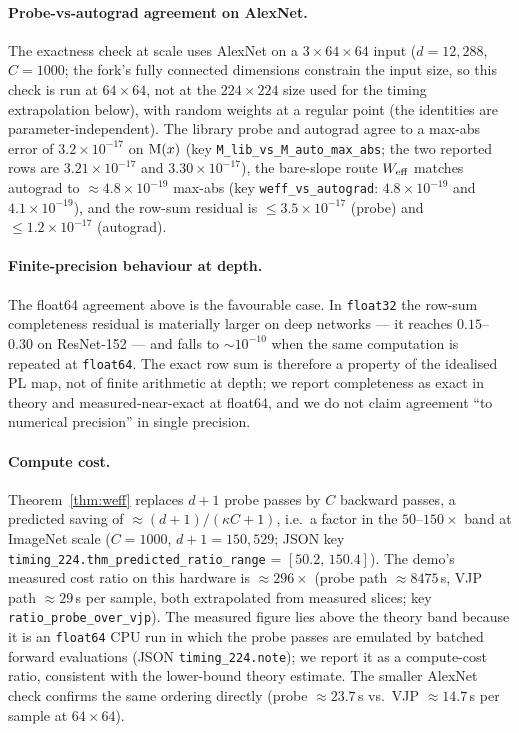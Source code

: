 \paragraph{Probe-vs-autograd agreement on AlexNet.}
The exactness check at scale uses AlexNet on a $3\times64\times64$ input
($d=12{,}288$, $C=1000$; the fork's fully connected dimensions constrain the
input size, so this check is run at $64\times64$, not at the $224\times224$
size used for the timing extrapolation below), with random weights at a
regular point (the identities are parameter-independent). The library probe
and autograd agree to a max-abs error of $3.2\times10^{-17}$ on $\mathrm{M}(x)$ (key
\texttt{M\_lib\_vs\_M\_auto\_max\_abs}; the two reported rows are
$3.21\times10^{-17}$ and $3.30\times10^{-17}$), the bare-slope route
$W_{\text{eff}}$ matches autograd to $\approx 4.8\times10^{-19}$ max-abs (key
\texttt{weff\_vs\_autograd}: $4.8\times10^{-19}$ and $4.1\times10^{-19}$),
and the row-sum residual is $\le 3.5\times10^{-17}$ (probe) and
$\le 1.2\times10^{-17}$ (autograd).

\paragraph{Finite-precision behaviour at depth.}
The float64 agreement above is the favourable case. In \texttt{float32} the
row-sum completeness residual is materially larger on deep networks --- it
reaches $0.15$--$0.30$ on ResNet-152 --- and falls to $\sim10^{-10}$ when the
same computation is repeated at \texttt{float64}. The exact row sum is therefore
a property of the idealised PL map, not of finite arithmetic at depth; we
report completeness as exact in theory and measured-near-exact at float64, and
we do not claim agreement ``to numerical precision'' in single precision.

\paragraph{Compute cost.}
Theorem~\ref{thm:weff} replaces $d{+}1$ probe passes by $C$ backward passes,
a predicted saving of $\approx(d{+}1)/(\kappa C+1)$, i.e.\ a factor in the
$50$--$150\times$ band at ImageNet scale ($C=1000$, $d{+}1=150{,}529$; JSON
key \texttt{timing\_224.thm\_predicted\_ratio\_range} =
$[50.2,\,150.4]$). The demo's measured cost ratio on this hardware is
$\approx296\times$ (probe path $\approx8475$\,s, VJP path $\approx29$\,s per
sample, both extrapolated from measured slices; key
\texttt{ratio\_probe\_over\_vjp}). The measured figure lies above the theory
band because it is an \texttt{float64} CPU run in which the probe passes are
emulated by batched forward evaluations (JSON \texttt{timing\_224.note});
we report it as a compute-cost ratio, consistent with the lower-bound theory
estimate. The smaller AlexNet check confirms the same ordering directly
(probe $\approx23.7$\,s vs.\ VJP $\approx14.7$\,s per sample at $64\times64$).

